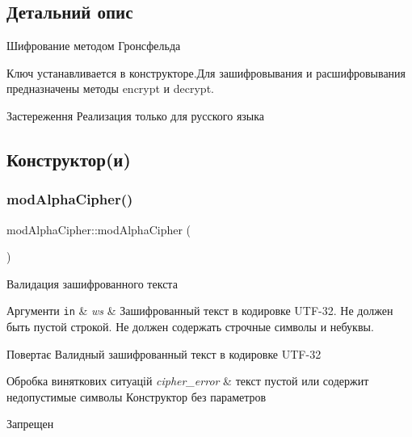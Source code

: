\subsection{Детальний опис}
Шифрование методом Гронсфельда 

Ключ устанавливается в конструкторе.\+Для зашифровывания и расшифровывания предназначены методы encrypt и decrypt. \begin{DoxyWarning}{Застереження}
Реализация только для русского языка 
\end{DoxyWarning}


\subsection{Конструктор(и)}
\mbox{\label{classmodAlphaCipher_a4f0a86c20f5d836f66cb1e640d875e6b}} 
\subsubsection{\texorpdfstring{mod\+Alpha\+Cipher()}{modAlphaCipher()}\hspace{0.1cm}{\footnotesize\ttfamily [1/2]}}
{\footnotesize\ttfamily mod\+Alpha\+Cipher\+::mod\+Alpha\+Cipher (\begin{DoxyParamCaption}{ }\end{DoxyParamCaption})\hspace{0.3cm}{\ttfamily [delete]}}



Валидация зашифрованного текста 


\begin{DoxyParams}[1]{Аргументи}
\mbox{\tt in}  & {\em ws} & Зашифрованный текст в кодировке U\+T\+F-\/32. Не должен быть пустой строкой. Не должен содержать строчные символы и небуквы. \\
\hline
\end{DoxyParams}
\begin{DoxyReturn}{Повертає}
Валидный зашифрованный текст в кодировке U\+T\+F-\/32 
\end{DoxyReturn}

\begin{DoxyExceptions}{Обробка виняткових ситуацій}
{\em cipher\+\_\+error} & текст пустой или содержит недопустимые символы Конструктор без параметров\\
\hline
\end{DoxyExceptions}
Запрещен \mbox{\label{classmodAlphaCipher_a6c6305969b8a57ac1c1c9cc5f5215b6d}} 
